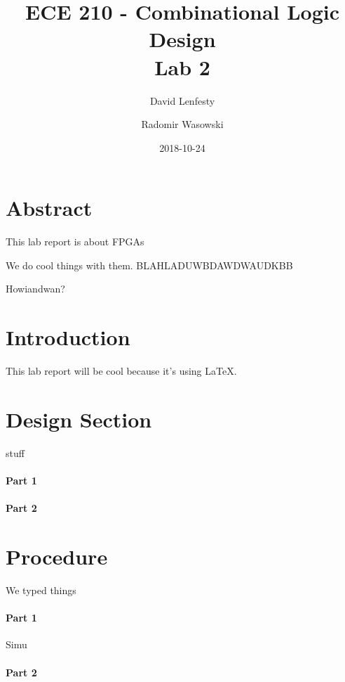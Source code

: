 \documentclass{article}
\title{ECE 210 - Combinational Logic Design \\
    Lab 2}
\date{2018-10-24}
\author{David Lenfesty \and Radomir Wasowski}
\begin{document}
    \maketitle
    \newpage

    \doublespacing
    \tableofcontents
    \newpage


    \singlespacing

    \section{Abstract}

    This lab report is about FPGAs

    We do cool things with them.
    BLAHLADUWBDAWDWAUDKBB


    Howiandwan?


    \section{Introduction}
    This lab report will be cool because it's using LaTeX.

    \section{Design Section}
    stuff

    \paragraph{Part 1}

    \paragraph{Part 2}

    \section{Procedure}
    We typed things

    \paragraph{Part 1}

    Simu

    \paragraph{Part 2}
\end{document}
